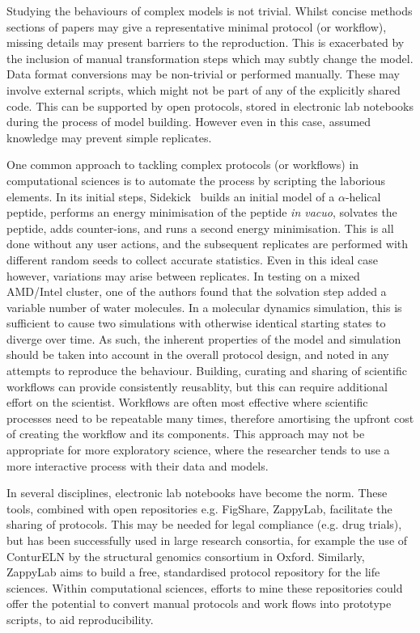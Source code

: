 \documentclass[conference]{IEEEtran}
\begin{document}
Studying the behaviours of complex models is not trivial. Whilst 
concise methods sections of papers may give a representative minimal
protocol (or workflow), missing details may present barriers to 
the reproduction. This is exacerbated by the inclusion of manual 
transformation steps which may subtly change the model. Data format 
conversions may be non-trivial or performed manually. These may 
involve external scripts, which might not be part of any of the
explicitly shared code. This can be supported by open protocols, stored 
in electronic lab notebooks during the process of model building. However
even in this case, assumed knowledge may prevent simple replicates.

One common approach to tackling complex protocols (or workflows) in
computational sciences is to automate the process by scripting the
laborious elements. In its initial steps,
Sidekick~\cite{Hall2014Sidekick} builds an initial model of a
$\alpha$-helical peptide, performs an energy minimisation of the
peptide \emph{in vacuo}, solvates the peptide, adds counter-ions, and
runs a second energy minimisation. This is all done without any user
actions, and the subsequent replicates are performed with different
random seeds to collect accurate statistics. Even in this ideal case
however, variations may arise between replicates. In testing on a
mixed AMD/Intel cluster, one of the authors found that the solvation
step added a variable number of water molecules. In a molecular
dynamics simulation, this is sufficient to cause two simulations with
otherwise identical starting states to diverge over time. As such, the
inherent properties of the model and simulation should be taken into
account in the overall protocol design, and noted in any attempts to
reproduce the behaviour. Building, curating and sharing of scientific 
workflows can provide consistently reusablity, but this can require additional
effort on the scientist. %
Workflows are often most effective where scientific
processes need to be repeatable many times, therefore amortising the upfront
cost of creating the workflow and its components. This approach may not
be appropriate for more exploratory science, where the researcher tends to 
use a more interactive process with their data and models.

In several disciplines, electronic lab notebooks have become the
norm. These tools, combined with open repositories e.g. FigShare,
ZappyLab, facilitate the sharing of protocols. This may be needed for
legal compliance (e.g. drug trials), but has been successfully used in
large research consortia, for example the use of ConturELN by the
structural genomics consortium in Oxford. Similarly, ZappyLab aims to
build a free, standardised protocol repository for the life
sciences. Within computational sciences, efforts to mine these
repositories could offer the potential to convert manual protocols and
work flows into prototype scripts, to aid reproducibility.
\end{document}
